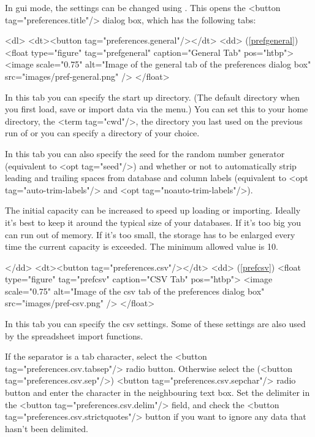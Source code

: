   In \gls{gui} mode, the settings can be changed using
   . This opens the 
   <button tag="preferences.title"/> dialog box, which has the 
   following tabs:

   <dl>
    <dt><button tag="preferences.general"/></dt>
    <dd>
     (\autoref{prefgeneral})
     <float type="figure" tag="prefgeneral" caption="General Tab" pos="htbp">
      <image scale="0.75" alt="Image of the general tab of the preferences dialog box" src="images/pref-general.png" />
     </float>

     In this tab you can specify the start up directory. (The default 
     directory when you first load, save or import data via the 
      menu.) You can set this to your home directory,
     the <term tag="cwd"/>, the directory you last used on the previous run
     of  or you can specify a directory of your choice.


     In this tab you can also specify the seed for the random number generator 
     (equivalent to <opt tag="seed"/>) and whether or not to automatically
     strip leading and trailing spaces from database and column labels
     (equivalent to <opt tag="auto-trim-labels"/> and 
     <opt tag="noauto-trim-labels"/>).


     The initial capacity can be increased to speed up loading or importing.
     Ideally it's best to keep it around the typical size of your databases.
     If it's too big you can run out of memory. If it's too small, the storage
     has to be enlarged every time the current capacity is exceeded. The
     minimum allowed value is 10.

    </dd>
    <dt><button tag="preferences.csv"/></dt>
    <dd>
     (\autoref{prefcsv})
     <float type="figure" tag="prefcsv" caption="CSV Tab" pos="htbp">
      <image scale="0.75" alt="Image of the csv tab of the preferences dialog box" src="images/pref-csv.png" />
     </float>

     In this tab you can specify the \gls{csv} settings. Some of
     these settings are also used by the spreadsheet import functions.

If the separator is a tab character, select the 
     <button tag="preferences.csv.tabsep"/> radio button. Otherwise
     select the (<button tag="preferences.csv.sep"/>) <button tag="preferences.csv.sepchar"/> radio button
     and enter the character in the neighbouring text box. Set the delimiter
     in the <button tag="preferences.csv.delim"/> field, and
     check the <button tag="preferences.csv.strictquotes"/> button
     if you want to ignore any data that hasn't been delimited.


